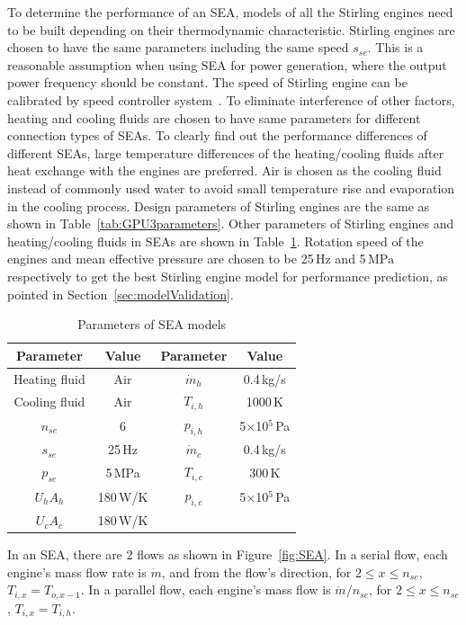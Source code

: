 To determine the performance of an SEA, models of all the Stirling engines need to be built depending on their thermodynamic characteristic. Stirling engines are chosen to have the same parameters including the same speed $s_{se}$. This is a reasonable assumption when using SEA for power generation, where the output power frequency should be constant. The speed of Stirling engine can be calibrated by speed controller system~\cite{Hooshang2016}. To eliminate interference of other factors, heating and cooling fluids are chosen to have same parameters for different connection types of SEAs. To clearly find out the performance differences of different SEAs, large temperature differences of the heating/cooling fluids after heat exchange with the engines are preferred. Air is chosen as the cooling fluid instead of commonly used water to avoid small temperature rise and evaporation in the cooling process. Design parameters of Stirling engines are the same as shown in Table~\ref{tab:GPU3parameters}. Other parameters of Stirling engines and heating/cooling fluids in SEAs are shown in Table~\ref{tab:parameters}. Rotation speed of the engines and mean effective pressure are chosen to be 25$\,\mathrm{Hz}$ and 5$\,\mathrm{MPa}$ respectively to get the best Stirling engine model for performance prediction, as pointed in Section~\ref{sec:modelValidation}.

\begin{table}[htbp]
	\caption{Parameters of SEA models}
	\begin{center}
	\begin{tabular}{cccc}
		\toprule
		Parameter		&	Value	& Parameter	&	Value\\
		\midrule
		Heating fluid	&	Air		&	$\dot{m}_h$	&	0.4\,kg/s\\
		Cooling fluid	&	Air	&	$T_{i,h}$	&	1000\,K\\
		$n_{se}$	&	6	&	$p_{i,h}$	&	5$\times$10$^5$\,Pa\\
		$s_{se}$	&	25\,Hz	&	$\dot{m}_c$	&	0.4\,kg/s\\
		$p_{se}$		&	5\,MPa	&	$T_{i,c}$	&	300\,K\\
		$U_hA_h$	&	180\,W/K	&	$p_{i,c}$	&	5$\times$10$^5$\,Pa\\
		$U_cA_c$		&	180\,W/K	&&\\
		\bottomrule
	\end{tabular}
	\end{center}
	\label{tab:parameters}
\end{table}

In an SEA, there are 2 flows as shown in Figure~\ref{fig:SEA}. In a serial flow, each engine's mass flow rate is $\dot{m}$, and from the flow's direction, for $2\leqslant{}x\leqslant{}n_{se}$, $T_{i,x} = T_{o,x-1}$. In a parallel flow, each engine's mass flow is $\dot{m}/n_{se}$, for $2\leqslant{}x\leqslant{}n_{se}$, $T_{i,x} = T_{i,h}$.

